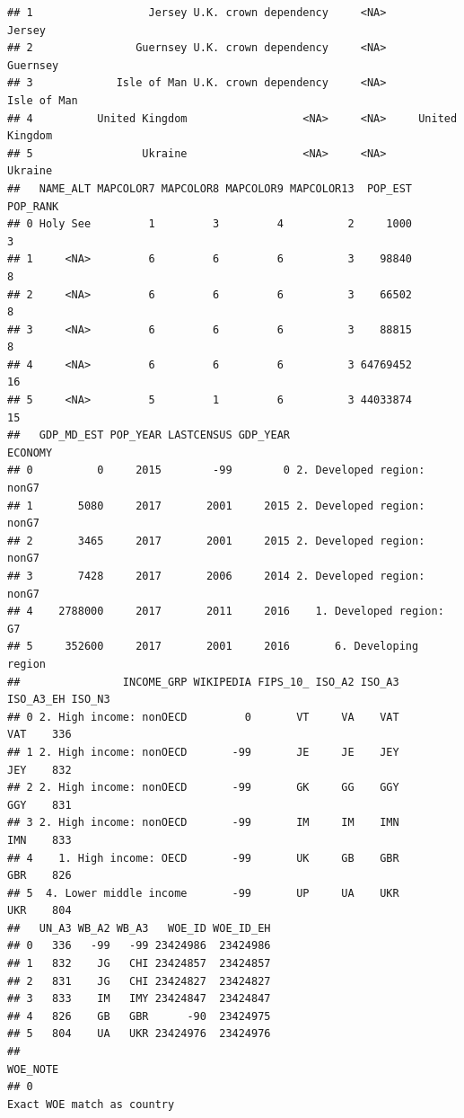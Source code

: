 \documentclass[
]{book}
\begin{document}
\begin{verbatim}
## 1                  Jersey U.K. crown dependency     <NA>             Jersey
## 2                Guernsey U.K. crown dependency     <NA>           Guernsey
## 3             Isle of Man U.K. crown dependency     <NA>        Isle of Man
## 4          United Kingdom                  <NA>     <NA>     United Kingdom
## 5                 Ukraine                  <NA>     <NA>            Ukraine
##   NAME_ALT MAPCOLOR7 MAPCOLOR8 MAPCOLOR9 MAPCOLOR13  POP_EST POP_RANK
## 0 Holy See         1         3         4          2     1000        3
## 1     <NA>         6         6         6          3    98840        8
## 2     <NA>         6         6         6          3    66502        8
## 3     <NA>         6         6         6          3    88815        8
## 4     <NA>         6         6         6          3 64769452       16
## 5     <NA>         5         1         6          3 44033874       15
##   GDP_MD_EST POP_YEAR LASTCENSUS GDP_YEAR                    ECONOMY
## 0          0     2015        -99        0 2. Developed region: nonG7
## 1       5080     2017       2001     2015 2. Developed region: nonG7
## 2       3465     2017       2001     2015 2. Developed region: nonG7
## 3       7428     2017       2006     2014 2. Developed region: nonG7
## 4    2788000     2017       2011     2016    1. Developed region: G7
## 5     352600     2017       2001     2016       6. Developing region
##                INCOME_GRP WIKIPEDIA FIPS_10_ ISO_A2 ISO_A3 ISO_A3_EH ISO_N3
## 0 2. High income: nonOECD         0       VT     VA    VAT       VAT    336
## 1 2. High income: nonOECD       -99       JE     JE    JEY       JEY    832
## 2 2. High income: nonOECD       -99       GK     GG    GGY       GGY    831
## 3 2. High income: nonOECD       -99       IM     IM    IMN       IMN    833
## 4    1. High income: OECD       -99       UK     GB    GBR       GBR    826
## 5  4. Lower middle income       -99       UP     UA    UKR       UKR    804
##   UN_A3 WB_A2 WB_A3   WOE_ID WOE_ID_EH
## 0   336   -99   -99 23424986  23424986
## 1   832    JG   CHI 23424857  23424857
## 2   831    JG   CHI 23424827  23424827
## 3   833    IM   IMY 23424847  23424847
## 4   826    GB   GBR      -90  23424975
## 5   804    UA   UKR 23424976  23424976
##                                                                                                                                                                  WOE_NOTE
## 0                                                                                                                                              Exact WOE match as country

\end{verbatim}
\end{document}
